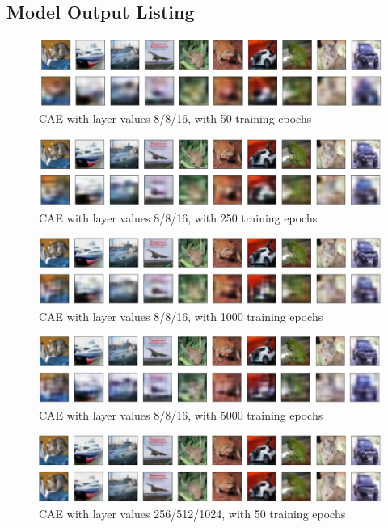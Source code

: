 \documentclass{article}
\begin{document}
\newpage
\begin{appendices}


\section{Model Output Listing} \label{modelouts}
\begin{figure}[H]
    \centering
    \includegraphics[width=4.75in]{csci-8110/hw-1/hw1-images/8-8-16-50.png}
    \caption{CAE with layer values 8/8/16, with 50 training epochs}
    \label{fig:b1}
\end{figure}
\begin{figure}[H]
    \centering
    \includegraphics[width=4.75in]{csci-8110/hw-1/hw1-images/8-8-16-250.png}
    \caption{CAE with layer values 8/8/16, with 250 training epochs}
    \label{fig:b2}
\end{figure}
\begin{figure}[H]
    \centering
    \includegraphics[width=4.75in]{csci-8110/hw-1/hw1-images/8-8-16-1000.png}
    \caption{CAE with layer values 8/8/16, with 1000 training epochs}
    \label{fig:b3}
\end{figure}
\begin{figure}[H]
    \centering
    \includegraphics[width=4.75in]{csci-8110/hw-1/hw1-images/8-8-16-5000.png}
    \caption{CAE with layer values 8/8/16, with 5000 training epochs}
    \label{fig:b4}
\end{figure}
\begin{figure}[H]
    \centering
    \includegraphics[width=4.75in]{csci-8110/hw-1/hw1-images/256-512-1024-50.png}
    \caption{CAE with layer values 256/512/1024, with 50 training epochs}
    \label{fig:b5}
\end{figure}


\end{appendices}
\end{document}

